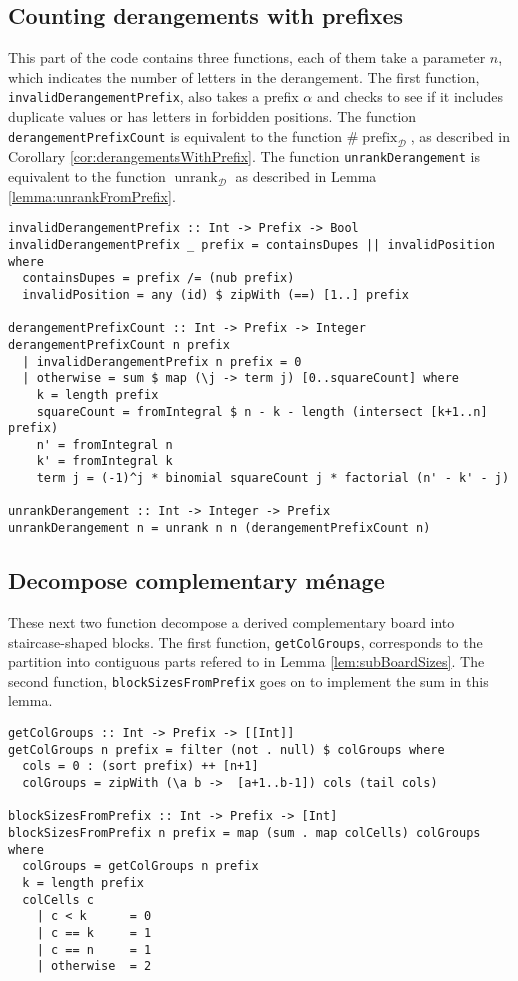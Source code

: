 \subsection{Counting derangements with prefixes}
This part of the code contains three functions, each of them take a parameter
$n$, which indicates the number of letters in the derangement.
The first function, \texttt{invalidDerangementPrefix}, also takes a prefix
$\alpha$ and checks to see if it includes duplicate values or has
letters in forbidden positions.
The function \texttt{derangementPrefixCount}
is equivalent to the function $\#\operatorname{prefix}_\mathcal{D}$,
as described in Corollary \ref{cor:derangementsWithPrefix}.
The function \texttt{unrankDerangement} is equivalent to the function
$\operatorname{unrank}_\mathcal{D}$ as described in
Lemma \ref{lemma:unrankFromPrefix}.
\begin{singlespace}\begin{verbatim}
invalidDerangementPrefix :: Int -> Prefix -> Bool
invalidDerangementPrefix _ prefix = containsDupes || invalidPosition where
  containsDupes = prefix /= (nub prefix)
  invalidPosition = any (id) $ zipWith (==) [1..] prefix

derangementPrefixCount :: Int -> Prefix -> Integer
derangementPrefixCount n prefix
  | invalidDerangementPrefix n prefix = 0
  | otherwise = sum $ map (\j -> term j) [0..squareCount] where
    k = length prefix
    squareCount = fromIntegral $ n - k - length (intersect [k+1..n] prefix)
    n' = fromIntegral n
    k' = fromIntegral k
    term j = (-1)^j * binomial squareCount j * factorial (n' - k' - j)

unrankDerangement :: Int -> Integer -> Prefix
unrankDerangement n = unrank n n (derangementPrefixCount n)
\end{verbatim}\end{singlespace}

\subsection{Decompose complementary m\'enage}
These next two function decompose a derived complementary board into
staircase-shaped blocks.
The first function, \texttt{getColGroups}, corresponds to the partition
into contiguous parts refered to in Lemma \ref{lem:subBoardSizes}.
The second function, \texttt{blockSizesFromPrefix} goes on to implement the
sum in this lemma.
\begin{singlespace}\begin{verbatim}
getColGroups :: Int -> Prefix -> [[Int]]
getColGroups n prefix = filter (not . null) $ colGroups where
  cols = 0 : (sort prefix) ++ [n+1]
  colGroups = zipWith (\a b ->  [a+1..b-1]) cols (tail cols)

blockSizesFromPrefix :: Int -> Prefix -> [Int]
blockSizesFromPrefix n prefix = map (sum . map colCells) colGroups where
  colGroups = getColGroups n prefix
  k = length prefix
  colCells c
    | c < k      = 0
    | c == k     = 1
    | c == n     = 1
    | otherwise  = 2
\end{verbatim}\end{singlespace}

